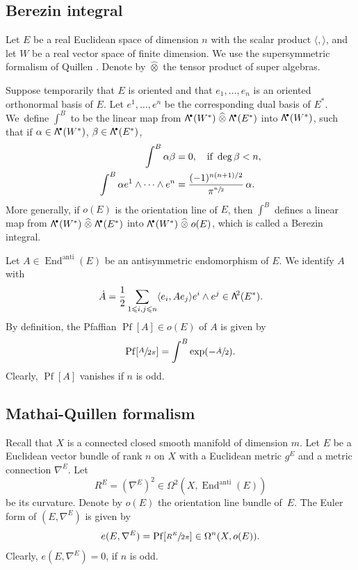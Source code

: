 \documentclass[11pt]{article}
\numberwithin{equation}{section}
\newcommand{\sbullet}{{\scriptscriptstyle\bullet}}
\newcommand\bw[1]{{\hbox{\large$\mathsf{\Lambda}$}^{\!#1}}}
\newcommand{\wotimes}{\mathrel{\widehat{\otimes}}}
\theoremstyle{plain}
\theoremstyle{definition}
\theoremstyle{remark}
\DeclareMathOperator{\End}{End}
\DeclareMathOperator{\Pf}{Pf}
\let\<\langle
\let\>\rangle
\let\l\leqslant
\begin{document}
\subsection{Berezin integral}\label{sec:Bere}
Let $E$ be a real Euclidean space of dimension $n$ with
the scalar product $\<,\>$, and let $W$ be a real vector space of
finite dimension. We use the supersymmetric formalism of Quillen
\cite{Quillensuper}. Denote by $\wotimes$ the tensor product of super algebras.

Suppose temporarily that $E$ is oriented and that $e_1,\ldots, e_n$
is an oriented orthonormal basis of $E$. Let $e^1,\ldots,e^n$ be the corresponding dual basis of $E^*$. We~define $\int^B$ to be the linear map from $\bw\sbullet(W^*)\wotimes\bw\sbullet(E^*)$ into $\bw\sbullet(W^*)$, such that if $\alpha\in \bw\sbullet(W^*)$, $\beta\in \bw\sbullet(E^*)$,
\begin{equation*}\label{eq:defBere}
\begin{split}
\int^B\alpha\beta&=0, \quad\text{if } \deg \beta<n,\\
\int^B\alpha
e^1\wedge\cdots\wedge e^n&=\frac{(-1)^{n(n+1)/2}}{\pi^{\sfrac{n}{2}}}\,\alpha.
\end{split}
\end{equation*}
More generally, if $o(E)$ is the orientation line of $E$, then $\int^B$ defines a linear map from $\bw\sbullet(W^*)\wotimes\bw\sbullet(E^*)$ into $\bw\sbullet(W^*)\wotimes o(E)$, which is called a Berezin integral.

Let $A\in \End^{\mathrm{anti}}(E)$ be an antisymmetric endomorphism of $E$. We identify $A$ with
\begin{equation}\label{eq:ALam}
\dot{A}=\frac{1}{2}\sum_{1\l i,j\l n}\<e_i,Ae_j\>e^i\wedge e^j\in \bw2(E^*).
\end{equation}
By definition, the Pfaffian $\Pf[A]\in o(E)$ of $A$ is given by
\begin{equation*}\label{eq:PfA}
\Pf[\sfrac{A}{2\pi}]=\int^B\exp(-\sfrac{\dot{A}}{2}).
\end{equation*}
Clearly, $\Pf[A]$ vanishes if $n$ is odd.

\subsection{Mathai-Quillen formalism}\label{sMQ}
Recall that $X$ is a connected closed smooth manifold of dimension $m$. Let
$E$ be a Euclidean vector bundle of rank $n$ on $X$ with a Euclidean
metric $g^{E}$ and a metric connection $\nabla^{E}$. Let
\[
R^{E}=(\nabla^{E})^{2}\in\Omega^{2}(X,\End^\mathrm{anti}(E))
\]
be its curvature. Denote by $o(E)$ the orientation line
bundle of~$E$.
The Euler form of
$(E,\nabla^{E})$ is given by
\begin{equation*}
e(E,\nabla^{E})=\Pf[\sfrac{R^{E}}{2\pi}] \in
\Omega^{n}(X,o(E)).
\end{equation*}
Clearly, $e(E,\nabla^{E})=0$, if $n$ is odd.
\end{document}
